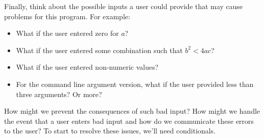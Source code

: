 Finally, think about the possible inputs a user could provide that may cause problems
for this program.  For example:
\begin{itemize}
  \item What if the user entered zero for $a$?
  \item What if the user entered some combination such that $b^2 < 4ac$?
  \item What if the user entered non-numeric values?
  \item For the command line argument version, what if the user provided less than
  	three arguments?  Or more?
\end{itemize}
How might we prevent the consequences of such bad input?  
How might we handle the event that a user enters bad input and
how do we communicate these errors to the user?  To start to resolve
these issues, we'll need conditionals.
